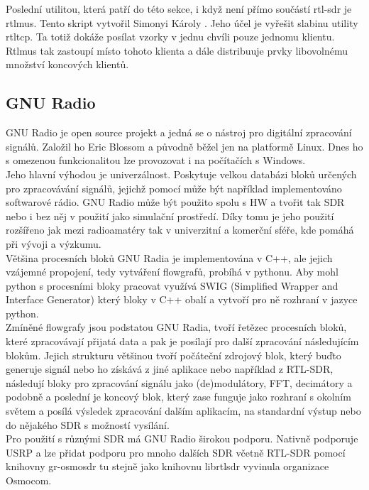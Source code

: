 \documentclass{ctuthesis}
\begin{document}
Poslední utilitou, která patří do této sekce, i když není přímo součástí rtl-sdr je rtl\textunderscore mus. Tento skript vytvořil Simonyi Károly \cite{rtlmus}. Jeho účel je vyřešit slabinu utility rtl\textunderscore tcp. Ta totiž dokáže posílat vzorky v jednu chvíli pouze jednomu klientu. Rtl\textunderscore mus tak zastoupí místo tohoto klienta a dále distribuuje prvky libovolnému množství koncových klientů.

\subsection{GNU Radio} \label{gnuradiosekce}
GNU Radio je open source projekt a jedná se o nástroj pro digitální zpracování signálů. Založil ho Eric Blossom a původně běžel jen na platformě Linux. Dnes ho s omezenou funkcionalitou lze provozovat i na počítačích s Windows.\\
Jeho hlavní výhodou je univerzálnost. Poskytuje velkou databázi bloků určených pro zpracovávání signálů, jejichž pomocí může být například implementováno softwarové rádio. GNU Radio může být použito spolu s HW a tvořit tak SDR nebo i bez něj v použití jako simulační prostředí. Díky tomu je jeho použití rozšířeno jak mezi radioamatéry tak v univerzitní a komerční sféře, kde pomáhá při vývoji a výzkumu.\\
Většina procesních bloků GNU Radia je implementována v C++, ale jejich vzájemné propojení, tedy vytváření flowgrafů, probíhá v pythonu. Aby mohl python s procesními bloky pracovat využívá SWIG (Simplified Wrapper and Interface Generator) který bloky v C++ obalí a vytvoří pro ně rozhraní v jazyce python. \cite{gnuradio}\\
Zmíněné flowgrafy jsou podstatou GNU Radia, tvoří řetězec procesních bloků, které zpracovávají přijatá data a pak je posílají pro další zpracování následujícím blokům. Jejich strukturu většinou tvoří počáteční zdrojový blok, který buďto generuje signál nebo ho získává z jiné aplikace nebo například z RTL-SDR, následují bloky pro zpracování signálu jako (de)modulátory, FFT, decimátory a podobně a poslední je koncový blok, který zase funguje jako rozhraní s okolním světem a posílá výsledek zpracování dalším aplikacím, na standardní výstup nebo do nějakého SDR s možností vysílání.\\
Pro použití s různými SDR má GNU Radio širokou podporu. Nativně podporuje USRP a lze přidat podporu pro mnoho dalších SDR včetně RTL-SDR pomocí knihovny gr-osmosdr  tu stejně jako knihovnu librtlsdr vyvinula organizace Osmocom.
\end{document}
